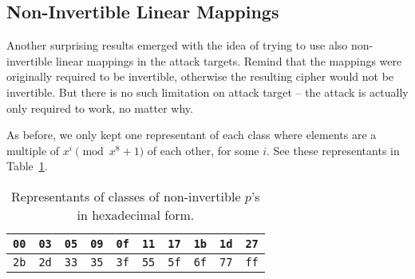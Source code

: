 


\subsection{Non-Invertible Linear Mappings}
\label{sec:noninv}

Another surprising results emerged with the idea of trying to use also non-invertible linear mappings in the attack targets. Remind that the mappings were originally required to be invertible, otherwise the resulting cipher would not be invertible. But there is no such limitation on attack target -- the attack is actually only required to work, no matter why.

As before, we only kept one representant of each class where elements are a multiple of $x^i\pmod{x^8+1}$ of each other, for some $i$. See these representants in Table~\ref{tab:classreprenoninv}.

\begin{table}[h]
	\begin{center}
	\begin{tabular}{| c | c | c | c | c | c | c | c | c | c |}
		\hline
		{\tt 00} & {\tt 03} & {\tt 05} & {\tt 09} & {\tt 0f} & {\tt 11} & {\tt 17} & {\tt 1b} & {\tt 1d} & {\tt 27} \\
		\hline
		{\tt 2b} & {\tt 2d} & {\tt 33} & {\tt 35} & {\tt 3f} & {\tt 55} & {\tt 5f} & {\tt 6f} & {\tt 77} & {\tt ff} \\
		\hline
	\end{tabular}
	\end{center}
\caption{Representants of classes of non-invertible $p$'s in hexadecimal form.}
\label{tab:classreprenoninv}
\end{table}


